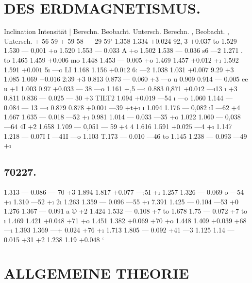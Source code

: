 \documentclass[12pt,a4paper]{article}
\begin{document}
\newpage


\section*{DES ERDMAGNETISMUS.}
Inclination Intensität | Berechn. Beobacht. Untersch. Berechn. , Beobacht. , Untersch. + 56\textdegree{} 59 + 59\textdegree{} 58\textdegree{} --- 29 59' 1.358 1.334
$+ 0.024$
92, 3%
$+ 0.037$
to 1.529 1.530 --- 0,001 +o 1.520 1.553 --- 0.033 A +o 1.502 1.538 --- 0.036 s6 ---2 1.271 \textdegree{}. to 1.465 1.459
$+ 0.006$
mo 1.448 1.453 --- 0.005 +o 1.469 1.457
$+ 0.012$
+\i{} 1.592 1.591
$+ 0.001$
5\i{} ---o LI 1.168 1.156
$+ 0.012$
6: ---2 1.038 1.031
$+ 0.007$
9.29 +3 1.085 1.069
$+ 0.016$
2:39 +3 0.813 0.873 --- 0.060 +3 ---o u 0.909 0.914 --- 0.005 ee u   +1 1.003 0.97
$+ 0.033$
--- 38 ---o 1.161 +,5 ---\i{} 0.883 0,871
$+ 0.012$
---\i{}13 \i{} +3 0.811 0.836 --- 0.025 --- 30 +3 TILT2 1.094
$+ 0.019$
---54 \i{} ---o 1.060 1.144 --- 0.084 --- 13 ---\i{} 0.879 0.878
$+ 0.001$
---39 +t+\i{} \i{} 1.094 1.176 --- 0,082 \i{}I ---62 +4 1.667 1.635 --- 0.018 ---52 +\i{} 0.981 1.014 --- 0.033 ---35 +o 1.022 1.060 --- 0,038 ---64 4I +2 1.658 1.709 --- 0,051 --- 59 +4 4 1.616 1.591
$+ 0.025$
---4 +\i{} 1.147 1.218 --- 0.07I I ---41I ---o 1.103 T.173 --- 0.010 ---46 to 1.145 1.238 --- 0.093 ---49 +\i{}

\subsection*{70227.}
1.313 --- 0.086 --- 70 +3 1.894 1.817
$+ 0.077$
---;5I +\i{} 1.257 1.326 --- 0.069 o ---54 +\i{} 1.310 ---52 +\i{} 2\i{} 1.263 1.359 --- 0.096 ---55 +\i{} 7.391 1.425 --- 0.104 ---53 +0 1.276 1.367 --- 0.091 a \copyright{} +2 1.424 1.532 --- 0.108 +7 to 1.678 1.75 --- 0.072 +7 to \i{} 1.469 1.421
$+ 0.048$
+71 +o 1.451 1.382
$+ 0.069$
+70 +o 1.448 1.409
$+ 0.039$
+68 ---\i{} 1.393 1.369 ---+ 0.024 +76 +\i{} 1.713 1.805 --- 0.092 +41 ---3 1.125 1.14 --- 0.015 +31 +2 1.238 1.19
$+ 0.048$
`


\newpage


\section*{ALLGEMEINE THEORIE}
\end{document}
